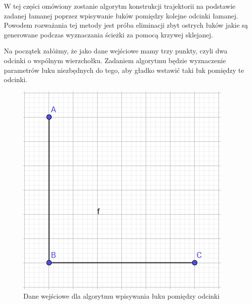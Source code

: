 \documentclass[a4paper,11pt,twoside]{report}
\theoremstyle{definition}
\begin{document}
W tej części omówiony zostanie algorytm konstrukcji trajektorii na podstawie zadanej łamanej poprzez wpisywanie łuków pomiędzy kolejne odcinki łamanej. Powodem rozważania tej metody jest próba eliminacji zbyt ostrych łuków jakie są generowane podczas wyznaczania ścieżki za pomocą krzywej sklejanej.

Na początek załóżmy, że jako dane wejściowe mamy trzy punkty, czyli dwa odcinki o wspólnym wierzchołku. Zadaniem algorytmu będzie wyznaczenie parametrów łuku niezbędnych do tego, aby gładko wstawić taki łuk pomiędzy te odcinki. 

\begin{figure}[h!]
\centering
\includegraphics[scale=0.35]{arcsAlgorithmStep1}
\caption[Dane wejściowe dla algorytmu wpisywania łuku pomiędzy odcinki]{Dane wejściowe dla algorytmu wpisywania łuku pomiędzy odcinki}
\end{figure}
\end{document}
